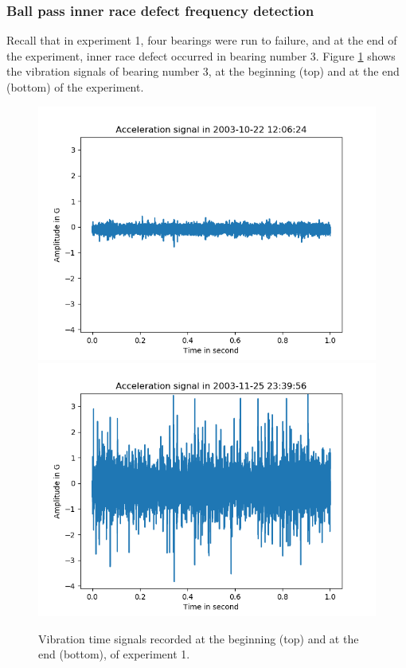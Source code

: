 \documentclass[../Main/thesis.tex]{subfiles}
\begin{document}
\subsubsection{Ball pass inner race defect frequency detection}
Recall that in experiment 1, four bearings were run to failure, and at the end of the experiment, inner race defect occurred in bearing number 3. Figure \ref{fig:bpfi_signal} shows the vibration signals of bearing number 3, at the beginning (top) and at the end (bottom) of the experiment.
\begin{figure}[H]
	\centering
	\includegraphics[width=0.7\linewidth]{../fig/bpfi/first_day_signal}
	\includegraphics[width=0.7\linewidth]{../fig/bpfi/last_day_signal}
	\caption{Vibration time signals recorded at the beginning (top) and at the end (bottom), of experiment 1.}
	\label{fig:bpfi_signal}
\end{figure}
\end{document}
